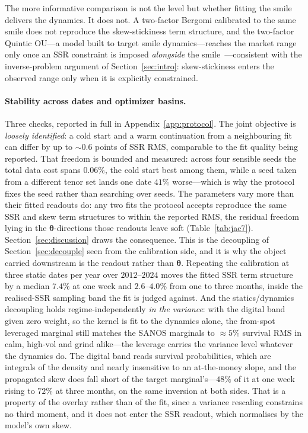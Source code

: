 \documentclass[11pt]{article}
\providecommand{\1}{\mathbf 1}
\newcommand{\bth}{{\boldsymbol{\theta}}}
\begin{document}
The more informative comparison is not the level but whether fitting the smile delivers the
dynamics. It does not. A two-factor Bergomi calibrated to the same smile does not reproduce the
skew-stickiness term structure, and the two-factor Quintic OU---a model built to target smile
dynamics---reaches the market range only once an SSR constraint is imposed \emph{alongside} the
smile~\cite{abijaber2025}---consistent with the inverse-problem argument of
Section~\ref{sec:intro}: skew-stickiness enters the observed range only when it is explicitly
constrained.

\paragraph{Stability across dates and optimizer basins.} Three checks, reported in full in
Appendix~\ref{app:protocol}. The joint objective is \emph{loosely identified}: a cold start
and a warm continuation from a neighbouring fit can differ by up to ${\sim}0.6$ points of SSR RMS,
comparable to the fit quality being reported. That freedom is bounded and measured: across four
sensible seeds the total data cost spans $0.06\%$, the cold start best among them, while a seed
taken from a different tenor set lands one date $41\%$ worse---which is why the protocol fixes the
seed rather than searching over seeds. The parameters vary more than their fitted readouts do: any
two fits the protocol accepts reproduce the same SSR and skew term structures to within the reported
RMS, the residual freedom lying in the $\bth$-directions those readouts leave soft
(Table~\ref{tab:jac7}). Section~\ref{sec:discussion} draws the consequence. This is the decoupling of
Section~\ref{sec:decouple} seen from the calibration side, and it is why the object carried
downstream is the readout rather than
$\bth$. Repeating the calibration at three static dates per year over $2012$--$2024$ moves the
fitted SSR term structure by a median $7.4\%$ at one week and $2.6$--$4.0\%$ from one to three
months, inside the realised-SSR sampling band the fit is judged against. And the statics/dynamics
decoupling holds regime-independently \emph{in the variance}: with the digital band given zero
weight, so the kernel is fit to the dynamics alone, the from-spot leveraged marginal still matches
the SANOS marginals to ${\approx}5\%$ survival RMS in calm, high-vol and grind alike---the leverage
carries the variance level
whatever the dynamics do. The digital band reads survival probabilities, which are integrals of
the density and nearly insensitive to an at-the-money slope,
and the propagated skew does fall short of the target marginal's---$48\%$ of it at one week rising
to $72\%$ at three months, on the same inversion at both sides. That is a property of the overlay
rather than of the fit, since a variance rescaling constrains no third moment, and it does not enter
the SSR readout, which normalises by the model's own skew.
\end{document}

